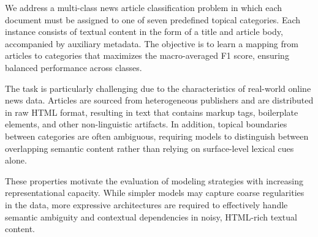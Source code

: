 We address a multi-class news article classification problem in which each document must be assigned to one of seven predefined topical categories. Each instance consists of textual content in the form of a title and article body, accompanied by auxiliary metadata. The objective is to learn a mapping from articles to categories that maximizes the macro-averaged F1 score, ensuring balanced performance across classes.

The task is particularly challenging due to the characteristics of real-world online news data. Articles are sourced from heterogeneous publishers and are distributed in raw HTML format, resulting in text that contains markup tags, boilerplate elements, and other non-linguistic artifacts. In addition, topical boundaries between categories are often ambiguous, requiring models to distinguish between overlapping semantic content rather than relying on surface-level lexical cues alone.

These properties motivate the evaluation of modeling strategies with increasing representational capacity. While simpler models may capture coarse regularities in the data, more expressive architectures are required to effectively handle semantic ambiguity and contextual dependencies in noisy, HTML-rich textual content.
